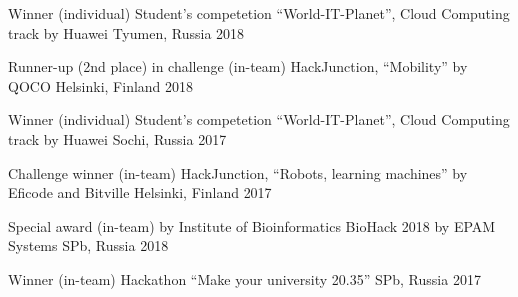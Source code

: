 



\begin{cvhonors}

	\cvhonor
		{Winner (individual)} %
		{Student's competetion \enquote{World-IT-Planet}, Cloud Computing track by Huawei} %
		{Tyumen, Russia} %
		{2018} %
		
	\cvhonor
		{Runner-up (2nd place) in challenge (in-team)} %
		{HackJunction, \enquote{Mobility} by QOCO} %
		{Helsinki, Finland} %
		{2018} %
		

	\cvhonor
		{Winner (individual)} %
		{Student's competetion \enquote{World-IT-Planet}, Cloud Computing track by Huawei} %
		{Sochi, Russia} %
		{2017} %
		
	\cvhonor
		{Challenge winner (in-team)} %
		{HackJunction, \enquote{Robots, learning machines} by Eficode and Bitville} %
		{Helsinki, Finland} %
		{2017} %

\end{cvhonors}




\begin{cvhonors}

	\cvhonor
		{Special award (in-team) by Institute of Bioinformatics} %
		{BioHack 2018 by EPAM Systems} %
		{SPb, Russia} %
		{2018} %

	\cvhonor
		{Winner (in-team)} %
		{Hackathon \enquote{Make your university 20.35}} %
		{SPb, Russia} %
		{2017} %


\end{cvhonors}
